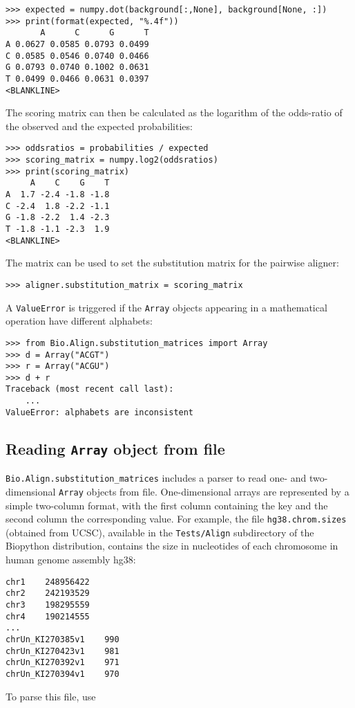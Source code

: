 \begin{verbatim}
>>> expected = numpy.dot(background[:,None], background[None, :])
>>> print(format(expected, "%.4f"))
       A      C      G      T
A 0.0627 0.0585 0.0793 0.0499
C 0.0585 0.0546 0.0740 0.0466
G 0.0793 0.0740 0.1002 0.0631
T 0.0499 0.0466 0.0631 0.0397
<BLANKLINE>
\end{verbatim}
The scoring matrix can then be calculated as the logarithm of the odds-ratio of the observed and the expected probabilities:

\begin{verbatim}
>>> oddsratios = probabilities / expected
>>> scoring_matrix = numpy.log2(oddsratios)
>>> print(scoring_matrix)
     A    C    G    T
A  1.7 -2.4 -1.8 -1.8
C -2.4  1.8 -2.2 -1.1
G -1.8 -2.2  1.4 -2.3
T -1.8 -1.1 -2.3  1.9
<BLANKLINE>
\end{verbatim}
The matrix can be used to set the substitution matrix for the pairwise aligner:

\begin{verbatim}
>>> aligner.substitution_matrix = scoring_matrix
\end{verbatim}

A \verb+ValueError+ is triggered if the \verb+Array+ objects appearing in a mathematical operation have different alphabets:

\begin{verbatim}
>>> from Bio.Align.substitution_matrices import Array
>>> d = Array("ACGT")
>>> r = Array("ACGU")
>>> d + r
Traceback (most recent call last):
    ...
ValueError: alphabets are inconsistent
\end{verbatim}

\subsection*{Reading \texttt{Array} object from file}

\verb+Bio.Align.substitution_matrices+ includes a parser to read one- and two-dimensional \verb+Array+ objects from file. One-dimensional arrays are represented by a simple two-column format, with the first column containing the key and the second column the corresponding value. For example, the file \verb+hg38.chrom.sizes+ (obtained from UCSC), available in the \verb+Tests/Align+ subdirectory of the Biopython distribution, contains the size in nucleotides of each chromosome in human genome assembly hg38:
\begin{verbatim}
chr1    248956422
chr2    242193529
chr3    198295559
chr4    190214555
...
chrUn_KI270385v1    990
chrUn_KI270423v1    981
chrUn_KI270392v1    971
chrUn_KI270394v1    970
\end{verbatim}
To parse this file, use

